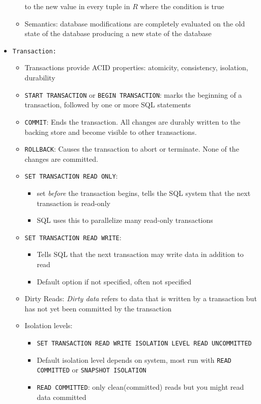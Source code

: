 \documentclass[landscape,8pt]{extarticle}
\newcommand{\code}{\lstinline}
\begin{document}
\begin{multicols}{4}
\begin{itemize}
\begin{itemize}
    to the new value in every tuple in $R$ where the condition is true
    \item Semantics: database modifications are completely evaluated on the old state of the
    database producing a new state of the database
\end{itemize}
\item \code{Transaction:}
\begin{itemize}
    \item Transactions provide ACID properties: atomicity, consistency, isolation, durability
    \item \code{START TRANSACTION} or \code{BEGIN TRANSACTION}: marks the beginning of a
    transaction, followed by one or more SQL statements
    \item \code{COMMIT}: Ends the transaction. All changes are durably written to the backing store
    and become visible to other transactions.
    \item \code{ROLLBACK}: Causes the transaction to abort or terminate. None of the changes are committed.
    \item \code{SET TRANSACTION READ ONLY}: 
    \begin{itemize}
        \item set \emph{before} the transaction begins, tells the SQL system that the next
        transaction is read-only
        \item SQL uses this to parallelize many read-only transactions
    \end{itemize}
    \item \code{SET TRANSACTION READ WRITE}:
    \begin{itemize}
        \item Tells SQL that the next transaction may write data in addition to read
        \item Default option if not specified, often not specified
    \end{itemize}
    \item Dirty Reads: \emph{Dirty data} refers to data that is written by a transaction but has not
    yet been committed by the transaction
    \item Isolation levels:
    \begin{itemize}
        \item \code{SET TRANSACTION READ WRITE ISOLATION LEVEL READ UNCOMMITTED}
        \item Default isolation level depends on system, most run with \code{READ COMMITTED} or \code{SNAPSHOT ISOLATION}
        \item \code{READ COMMITTED}: only clean(committed) reads but you might read data committed

\end{itemize}
\end{itemize}
\end{itemize}
\end{multicols}
\end{document}
